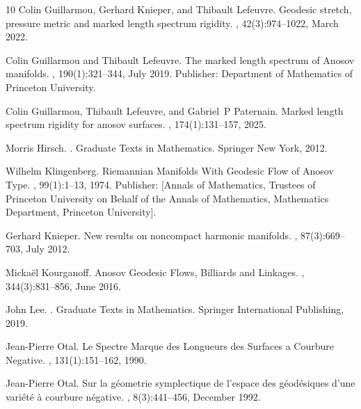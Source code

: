 \documentclass[reqno,11pt]{amsart}
\begin{document}
\begin{thebibliography}{10}
Colin Guillarmou, Gerhard Knieper, and Thibault Lefeuvre.
\newblock Geodesic stretch, pressure metric and marked length spectrum rigidity.
, 42(3):974--1022, March 2022.

Colin Guillarmou and Thibault Lefeuvre.
\newblock The marked length spectrum of {Anosov} manifolds.
, 190(1):321--344, July 2019.
\newblock Publisher: Department of Mathematics of Princeton University.

Colin Guillarmou, Thibault Lefeuvre, and Gabriel~P Paternain.
\newblock Marked length spectrum rigidity for anosov surfaces.
, 174(1):131--157, 2025.

Morris Hirsch.
.
\newblock Graduate Texts in Mathematics. Springer New York, 2012.

Wilhelm Klingenberg.
\newblock Riemannian {Manifolds} {With} {Geodesic} {Flow} of {Anosov} {Type}.
, 99(1):1--13, 1974.
\newblock Publisher: [Annals of Mathematics, Trustees of Princeton University on Behalf of the Annals of Mathematics, Mathematics Department, Princeton University].

Gerhard Knieper.
\newblock New results on noncompact harmonic manifolds.
, 87(3):669--703, July 2012.

Micka{\"e}l Kourganoff.
\newblock Anosov {Geodesic} {Flows}, {Billiards} and {Linkages}.
, 344(3):831--856, June 2016.

John Lee.
.
\newblock Graduate Texts in Mathematics. Springer International Publishing, 2019.

Jean-Pierre Otal.
\newblock Le {Spectre} {Marque} des {Longueurs} des {Surfaces} a {Courbure} {Negative}.
, 131(1):151--162, 1990.

Jean-Pierre Otal.
\newblock Sur la géometrie symplectique de l'espace des géodésiques d'une variété à courbure négative.
, 8(3):441--456, December 1992.


\end{thebibliography}
\end{document}
